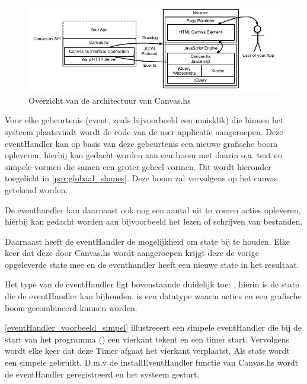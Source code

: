 \begin{figure}[H]
\begin{center}
\includegraphics[keepaspectratio,width=\textwidth]{./images/architectuur_overzicht.pdf}
\caption{Overzicht van de architectuur van Canvas.hs}
\label{fig:overzicht_architectuur}
\end{center}
\end{figure}


Voor elke gebeurtenis (event, zoals bijvoorbeeld een muisklik) die binnen het systeem plaatsvindt wordt de code van de user applicatie aangeroepen. Deze eventHandler kan op basis van deze gebeurtenis een nieuwe grafische boom opleveren, hierbij kan gedacht worden aan een boom met daarin o.a. text en simpele vormen die samen een groter geheel vormen. Dit wordt hieronder toegelicht in \autoref{par:globaal_shapes}. Deze boom zal vervolgens op het canvas getekend worden. 

De eventhandler kan daarnaast ook nog een aantal uit te voeren acties opleveren, hierbij kan gedacht worden aan bijvoorbeeld het lezen of schrijven van bestanden. 

Daarnaast heeft de eventHandler de mogelijkheid om state bij te houden. Elke keer dat deze door Canvas.hs wordt aangeroepen krijgt deze de vorige opgeleverde state mee en de eventhandler heeft een nieuwe state in het resultaat. 

Het type van de eventHandler ligt bovenstaande duidelijk toe: , hierin is  de state die de eventHandler kan bijhouden.  is een datatype waarin acties en een grafische boom gecombineerd kunnen worden.


\autoref{eventHandler_voorbeeld_simpel} illustreeert een simpele eventHandler die bij de start van het programma () een vierkant tekent en een timer start. Vervolgens wordt elke keer dat deze Timer afgaat het vierkant verplaatst. Als state wordt een simpele  gebruikt. D.m.v de installEventHandler functie van Canvas.hs wordt de eventHandler geregistreerd en het systeem gestart.

